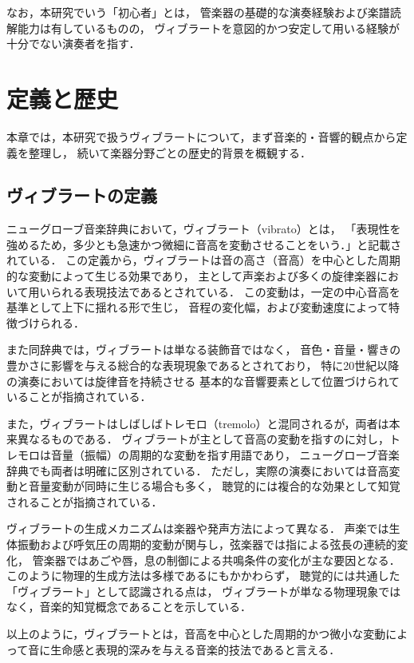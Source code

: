 なお，本研究でいう「初心者」とは，
管楽器の基礎的な演奏経験および楽譜読解能力は有しているものの，
ヴィブラートを意図的かつ安定して用いる経験が十分でない演奏者を指す．

\section{定義と歴史}
本章では，本研究で扱うヴィブラートについて，まず音楽的・音響的観点から定義を整理し，
続いて楽器分野ごとの歴史的背景を概観する．

\subsection{ヴィブラートの定義}

ニューグローブ音楽辞典\cite{Niyugurovu}において，ヴィブラート（vibrato）とは，
「表現性を強めるため，多少とも急速かつ微細に音高を変動させることをいう．」と記載されている．
この定義から，ヴィブラートは音の高さ（音高）を中心とした周期的な変動によって生じる効果であり，
主として声楽および多くの旋律楽器において用いられる表現技法であるとされている．
この変動は，一定の中心音高を基準として上下に揺れる形で生じ，
音程の変化幅，および変動速度によって特徴づけられる．

また同辞典では，ヴィブラートは単なる装飾音ではなく，
音色・音量・響きの豊かさに影響を与える総合的な表現現象であるとされており，
特に20世紀以降の演奏においては旋律音を持続させる
基本的な音響要素として位置づけられていることが指摘されている．

また，ヴィブラートはしばしばトレモロ（tremolo）と混同されるが，両者は本来異なるものである．
ヴィブラートが主として音高の変動を指すのに対し，トレモロは音量（振幅）の周期的な変動を指す用語であり，
ニューグローブ音楽辞典でも両者は明確に区別されている．
ただし，実際の演奏においては音高変動と音量変動が同時に生じる場合も多く，
聴覚的には複合的な効果として知覚されることが指摘されている．

ヴィブラートの生成メカニズムは楽器や発声方法によって異なる．
声楽では生体振動および呼気圧の周期的変動が関与し，弦楽器では指による弦長の連続的変化，
管楽器ではあごや唇，息の制御による共鳴条件の変化が主な要因となる．
このように物理的生成方法は多様であるにもかかわらず，
聴覚的には共通した「ヴィブラート」として認識される点は，
ヴィブラートが単なる物理現象ではなく，音楽的知覚概念であることを示している．

以上のように，ヴィブラートとは，音高を中心とした周期的かつ微小な変動によって音に生命感と表現的深みを与える音楽的技法であると言える．

